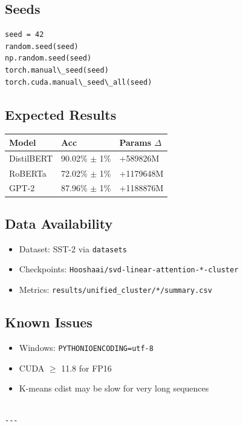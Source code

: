 \subsection{Seeds}

\begin{lstlisting}
seed = 42
random.seed(seed)
np.random.seed(seed)
torch.manual\_seed(seed)
torch.cuda.manual\_seed\_all(seed)
\end{lstlisting}

\subsection{Expected Results}

\begin{table}[H]
\centering
\small
\begin{tabular}{lll}
\toprule
\textbf{Model} & \textbf{Acc} & \textbf{Params $\Delta$} \\
\midrule
DistilBERT & 90.02\% $\pm$ 1\% & +589826M \\
RoBERTa & 72.02\% $\pm$ 1\% & +1179648M \\
GPT-2 & 87.96\% $\pm$ 1\% & +1188876M \\
\bottomrule
\end{tabular}
\end{table}

\subsection{Data Availability}

\begin{itemize}
\item Dataset: SST-2 via \texttt{datasets}
\item Checkpoints: \texttt{Hooshaai/svd-linear-attention-*-cluster}
\item Metrics: \texttt{results/unified\_cluster/*/summary.csv}

\end{itemize}
\subsection{Known Issues}

\begin{itemize}
\item Windows: \texttt{PYTHONIOENCODING=utf-8}
\item CUDA $\ge$ 11.8 for FP16
\item K-means cdist may be slow for very long sequences
\end{itemize}
\begin{lstlisting}

---
\end{lstlisting}
